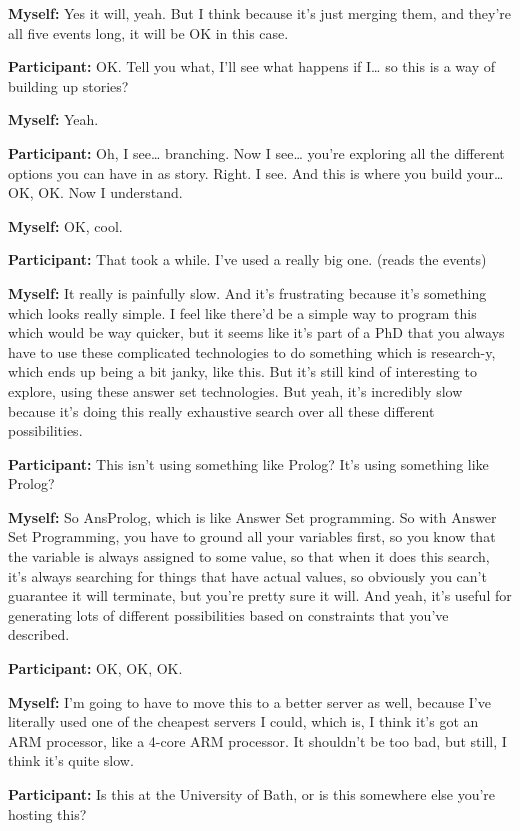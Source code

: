 \documentclass[11pt]{report}
\begin{document}
\begin{linenumbers}
\textbf{Myself:} Yes it will, yeah. But I think because it's just merging them, and they're all five events long, it will be OK in this case.

\textbf{Participant:} OK. Tell you what, I'll see what happens if I\ldots{} so this is a way of building up stories?

\textbf{Myself:} Yeah.

\textbf{Participant:} Oh, I see\ldots{} branching. Now I see\ldots{} you're exploring all the different options you can have in as story. Right. I see. And this is where you build your\ldots{} OK, OK. Now I understand.

\textbf{Myself:} OK, cool.

\textbf{Participant:} That took a while. I've used a really big one. (reads the events)

\textbf{Myself:} It really is painfully slow. And it's frustrating because it's something which looks really simple. I feel like there'd be a simple way to program this which would be way quicker, but it seems like it's part of a PhD that you always have to use these complicated technologies to do something which is research-y, which ends up being a bit janky, like this. But it's still kind of interesting to explore, using these answer set technologies. But yeah, it's incredibly slow because it's doing this really exhaustive search over all these different possibilities.

\textbf{Participant:} This isn't using something like Prolog? It's using something like Prolog?

\textbf{Myself:} So AnsProlog, which is like Answer Set programming. So with Answer Set Programming, you have to ground all your variables first, so you know that the variable is always assigned to some value, so that when it does this search, it's always searching for things that have actual values, so obviously you can't guarantee it will terminate, but you're pretty sure it will. And yeah, it's useful for generating lots of different possibilities based on constraints that you've described.

\textbf{Participant:} OK, OK, OK.

\textbf{Myself:} I'm going to have to move this to a better server as well, because I've literally used one of the cheapest servers I could, which is, I think it's got an ARM processor, like a 4-core ARM processor. It shouldn't be too bad, but still, I think it's quite slow.

\textbf{Participant:} Is this at the University of Bath, or is this somewhere else you're hosting this?


\end{linenumbers}
\end{document}
